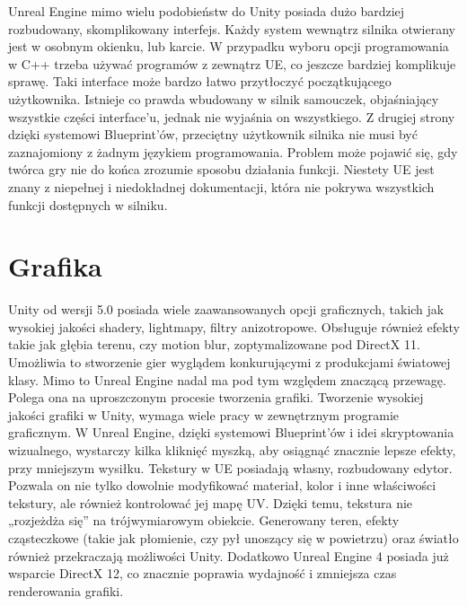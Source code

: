 \documentclass[openright]{xmgr}
\begin{document}
Unreal Engine mimo wielu podobieństw do Unity posiada dużo bardziej rozbudowany, skomplikowany interfejs. Każdy system wewnątrz silnika otwierany jest w osobnym okienku, lub karcie. W przypadku wyboru opcji programowania w C++ trzeba używać programów z zewnątrz UE, co jeszcze bardziej komplikuje sprawę. Taki interface może bardzo łatwo przytłoczyć początkującego użytkownika. Istnieje co prawda wbudowany w silnik samouczek, objaśniający wszystkie części interface’u, jednak nie wyjaśnia on wszystkiego.
Z drugiej strony dzięki systemowi Blueprint’ów, przeciętny użytkownik silnika nie musi być zaznajomiony z żadnym językiem programowania.
Problem może pojawić się, gdy twórca gry nie do końca zrozumie sposobu działania funkcji. Niestety UE jest znany z niepełnej i niedokładnej dokumentacji, która nie pokrywa wszystkich funkcji dostępnych w silniku.

\section{Grafika}

Unity od wersji 5.0 posiada wiele zaawansowanych opcji graficznych, takich jak wysokiej jakości shadery, lightmapy, filtry anizotropowe. Obsługuje również efekty takie jak głębia terenu, czy motion blur, zoptymalizowane pod DirectX 11. Umożliwia to stworzenie gier wyglądem konkurującymi z produkcjami światowej klasy.
Mimo to Unreal Engine nadal ma pod tym względem znaczącą przewagę. Polega ona na uproszczonym procesie tworzenia grafiki. Tworzenie wysokiej jakości grafiki w Unity, wymaga wiele pracy w zewnętrznym programie graficznym. W Unreal Engine, dzięki systemowi Blueprint’ów i idei skryptowania wizualnego, wystarczy kilka kliknięć myszką, aby osiągnąć znacznie lepsze efekty, przy mniejszym wysiłku. Tekstury w UE posiadają własny, rozbudowany edytor. Pozwala on nie tylko dowolnie modyfikować materiał, kolor i inne właściwości  tekstury, ale również kontrolować jej mapę UV. Dzięki temu, tekstura nie „rozjeżdża się” na trójwymiarowym obiekcie. Generowany teren, efekty cząsteczkowe (takie jak płomienie, czy pył unoszący się w powietrzu) oraz światło również przekraczają możliwości Unity. Dodatkowo Unreal Engine 4 posiada już wsparcie DirectX 12, co znacznie poprawia wydajność i zmniejsza czas renderowania grafiki.
\end{document}
